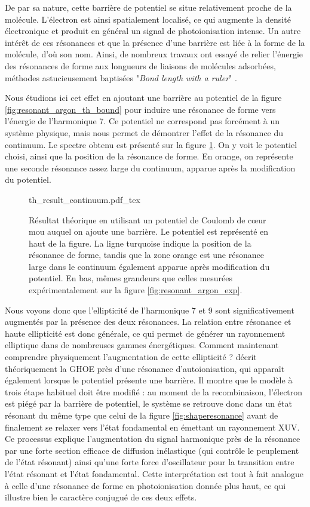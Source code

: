 De par sa nature, cette barrière de potentiel se situe relativement proche de la molécule. L'électron est ainsi spatialement localisé, ce qui augmente la densité électronique et produit en général un signal de photoionisation intense. Un autre intérêt de ces résonances et que la présence d'une barrière est liée à la forme de la molécule, d'où son nom. Ainsi, de nombreux travaux ont essayé de relier l'énergie des résonances de forme aux longueurs de liaisons de molécules adsorbées, méthodes astucieusement baptisées "\textit{Bond length with a ruler}" .

Nous étudions ici cet effet en ajoutant une barrière au potentiel de la figure \ref{fig:resonant_argon_th_bound} pour induire une résonance de forme vers l'énergie de l'harmonique 7. Ce potentiel ne correspond pas forcément à un système physique, mais nous permet de démontrer l'effet de la résonance du continuum. Le spectre obtenu est présenté sur la figure \ref{fig:resonant_argon_th_continuum}. On y voit le potentiel choisi, ainsi que la position de la résonance de forme. En orange, on représente une seconde résonance assez large du continuum, apparue après la modification du potentiel.

\begin{figure}[!ht]
\centering
\def\svgwidth{1\columnwidth}
{th_result_continuum.pdf_tex}
\caption{Résultat théorique en utilisant un potentiel de Coulomb de cœur mou auquel on ajoute une barrière. Le potentiel est représenté en haut de la figure. La ligne turquoise indique la position de la résonance de forme, tandis que la zone orange est une résonance large dans le continuum également apparue après modification du potentiel. En bas, mêmes grandeurs que celles mesurées expérimentalement sur la figure \ref{fig:resonant_argon_exp}.}
\label{fig:resonant_argon_th_continuum}
\end{figure}

Nous voyons donc que l'ellipticité de l'harmonique 7 et 9 sont significativement augmentés par la présence des deux résonances. La relation entre résonance et haute ellipticité est donc générale, ce qui permet de générer un rayonnement elliptique dans de nombreuses gammes énergétiques. Comment maintenant comprendre physiquement l'augmentation de cette ellipticité ?  décrit théoriquement la GHOE près d'une résonance d'autoionisation, qui apparaît également lorsque le potentiel présente une barrière. Il montre que le modèle à trois étape habituel doit être modifié : au moment de la recombinaison, l'électron est piégé par la barrière de potentiel, le système se retrouve donc dans un état résonant du même type que celui de la figure \ref{fig:shaperesonance} avant de finalement se relaxer vers l'état fondamental en émettant un rayonnement XUV. Ce processus explique l'augmentation du signal harmonique près de la résonance par une forte section efficace de diffusion inélastique (qui contrôle le peuplement de l'état résonant) ainsi qu'une forte force d'oscillateur pour la transition entre l'état résonant et l'état fondamental.
Cette interprétation est tout à fait analogue à celle d'une résonance de forme en photoionisation donnée plus haut, ce qui illustre bien le caractère conjugué de ces deux effets.

